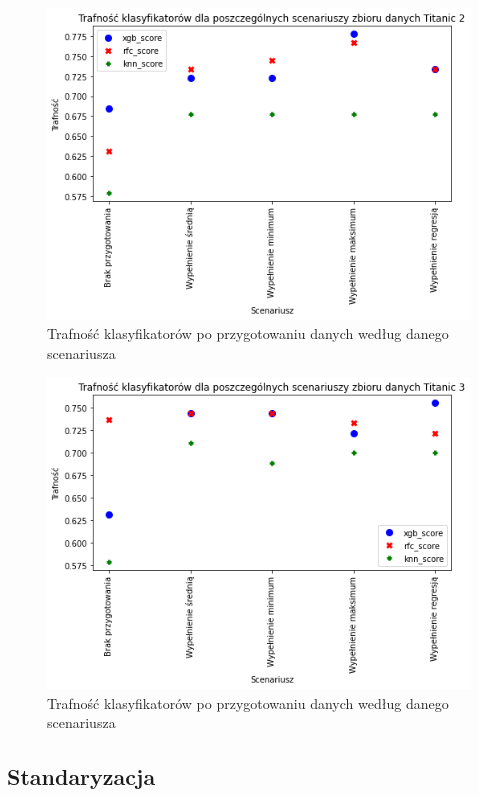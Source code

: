 \documentclass{book}
\begin{document}
\begin{figure}[H]
\centerline{\includegraphics{Titanic_2_Wypełnienie_brakujących}}
\centering
\caption{Trafność klasyfikatorów po przygotowaniu danych 
według danego scenariusza}
\end{figure}

\begin{figure}[H]
\centerline{\includegraphics{Titanic_3_Wypełnienie_brakujących}}
\centering
\caption{Trafność klasyfikatorów po przygotowaniu danych 
według danego scenariusza}
\end{figure}

\subsection{Standaryzacja}
\end{document}
